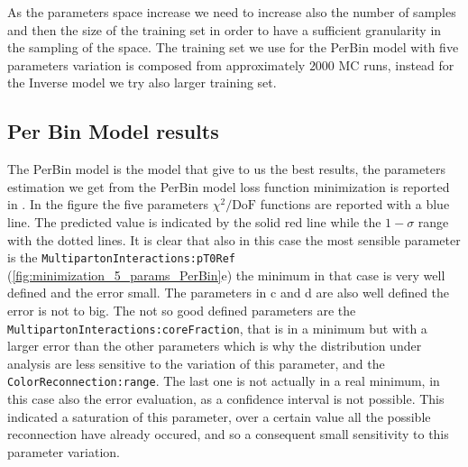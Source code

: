 \noindent As the parameters space increase we need to increase also the number of samples and then the size of the training set in order to have a sufficient granularity in the sampling of the space. 
The training set we use for the PerBin model with five parameters variation is composed from approximately $2000$ MC runs, instead for the Inverse model we try also larger training set. 

\subsection{Per Bin Model results}

The PerBin model is the model that give to us the best results, the parameters estimation we get from the PerBin model loss function minimization is reported in . In the figure the five parameters $\chi^2/\mathrm{DoF}$ functions are reported with a blue line. The predicted value is indicated by the solid red line while the $1-\sigma$ range with the dotted lines. 
It is clear that also in this case the most sensible parameter is the \texttt{MultipartonInteractions:pT0Ref} (\ref{fig:minimization_5_params_PerBin}e) the minimum in that case is very well defined and the error small. The parameters in c and d are also well defined the error is not to big. The not so good defined parameters are  the \texttt{MultipartonInteractions:coreFraction}, that is in a minimum but with a larger error than the other parameters which is why the distribution under analysis are less sensitive to the variation of this parameter, and the \texttt{ColorReconnection:range}. The last one is not actually in a real minimum, in this case also the error evaluation, as a confidence interval is not possible. This indicated a saturation of this parameter, over a certain value all the possible reconnection have already occured, and so a consequent small sensitivity to this parameter variation.
  
